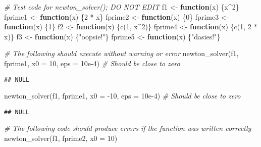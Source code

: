 \documentclass[
]{article}
\newenvironment{Shaded}{\begin{snugshade}}{\end{snugshade}}
\newcommand{\AttributeTok}[1]{\textcolor[rgb]{0.77,0.63,0.00}{#1}}
\newcommand{\CommentTok}[1]{\textcolor[rgb]{0.56,0.35,0.01}{\textit{#1}}}
\newcommand{\ControlFlowTok}[1]{\textcolor[rgb]{0.13,0.29,0.53}{\textbf{#1}}}
\newcommand{\DecValTok}[1]{\textcolor[rgb]{0.00,0.00,0.81}{#1}}
\newcommand{\FloatTok}[1]{\textcolor[rgb]{0.00,0.00,0.81}{#1}}
\newcommand{\FunctionTok}[1]{\textcolor[rgb]{0.00,0.00,0.00}{#1}}
\newcommand{\NormalTok}[1]{#1}
\newcommand{\OtherTok}[1]{\textcolor[rgb]{0.56,0.35,0.01}{#1}}
\newcommand{\SpecialCharTok}[1]{\textcolor[rgb]{0.00,0.00,0.00}{#1}}
\newcommand{\StringTok}[1]{\textcolor[rgb]{0.31,0.60,0.02}{#1}}
\begin{document}
\begin{Shaded}
\begin{Highlighting}[]
\CommentTok{\# Test code for newton\_solver(); DO NOT EDIT}
\NormalTok{f1 }\OtherTok{\textless{}{-}} \ControlFlowTok{function}\NormalTok{(x) \{x}\SpecialCharTok{\^{}}\DecValTok{2}\NormalTok{\}}
\NormalTok{fprime1 }\OtherTok{\textless{}{-}} \ControlFlowTok{function}\NormalTok{(x) \{}\DecValTok{2} \SpecialCharTok{*}\NormalTok{ x\}}
\NormalTok{fprime2 }\OtherTok{\textless{}{-}} \ControlFlowTok{function}\NormalTok{(x) \{}\DecValTok{0}\NormalTok{\}}
\NormalTok{fprime3 }\OtherTok{\textless{}{-}} \ControlFlowTok{function}\NormalTok{(x) \{}\DecValTok{1}\NormalTok{\}}
\NormalTok{f2 }\OtherTok{\textless{}{-}} \ControlFlowTok{function}\NormalTok{(x) \{}\FunctionTok{c}\NormalTok{(}\DecValTok{1}\NormalTok{, x}\SpecialCharTok{\^{}}\DecValTok{2}\NormalTok{)\}}
\NormalTok{fprime4 }\OtherTok{\textless{}{-}} \ControlFlowTok{function}\NormalTok{(x) \{}\FunctionTok{c}\NormalTok{(}\DecValTok{1}\NormalTok{, }\DecValTok{2} \SpecialCharTok{*}\NormalTok{ x)\}}
\NormalTok{f3 }\OtherTok{\textless{}{-}} \ControlFlowTok{function}\NormalTok{(x) \{}\StringTok{"oopsie!"}\NormalTok{\}}
\NormalTok{fprime5 }\OtherTok{\textless{}{-}} \ControlFlowTok{function}\NormalTok{(x) \{}\StringTok{"dasies!"}\NormalTok{\}}

\CommentTok{\# The following should execute without warning or error}
\FunctionTok{newton\_solver}\NormalTok{(f1, fprime1, }\AttributeTok{x0 =} \DecValTok{10}\NormalTok{, }\AttributeTok{eps =} \FloatTok{10e{-}4}\NormalTok{)   }\CommentTok{\# Should be close to zero}
\end{Highlighting}
\end{Shaded}

\begin{verbatim}
## NULL
\end{verbatim}

\begin{Shaded}
\begin{Highlighting}[]
\FunctionTok{newton\_solver}\NormalTok{(f1, fprime1, }\AttributeTok{x0 =} \SpecialCharTok{{-}}\DecValTok{10}\NormalTok{, }\AttributeTok{eps =} \FloatTok{10e{-}4}\NormalTok{)  }\CommentTok{\# Should be close to zero}
\end{Highlighting}
\end{Shaded}

\begin{verbatim}
## NULL
\end{verbatim}

\begin{Shaded}
\begin{Highlighting}[]
\CommentTok{\# The following code should produce errors if the function was written correctly}
\FunctionTok{newton\_solver}\NormalTok{(f1, fprime2, }\AttributeTok{x0 =} \DecValTok{10}\NormalTok{)}
\end{Highlighting}
\end{Shaded}
\end{document}

